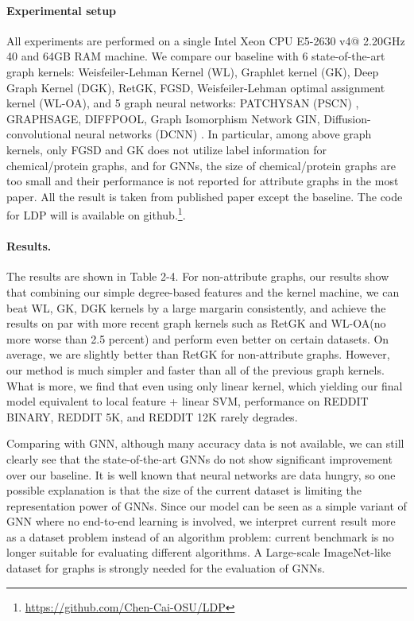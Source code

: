 \documentclass[11pt,onecolumn]{article}
\newcommand{\DOM}       {{LDP}\xspace}
\begin{document}
\paragraph{Experimental setup}
All experiments are performed on a single Intel Xeon CPU E5-2630 v4@ 2.20GHz  40 and 64GB RAM machine. We compare our baseline with 6 state-of-the-art graph kernels: Weisfeiler-Lehman Kernel (WL)\cite{shervashidze2011weisfeiler}, Graphlet kernel (GK)\cite{shervashidze2009efficient}, Deep Graph Kernel (DGK)\cite{yanardag2015deep}, RetGK\cite{zhang2018retgk}, FGSD\cite{verma2017hunt}, Weisfeiler-Lehman optimal assignment kernel (WL-OA)\cite{kriege2016valid}, and 5 graph neural networks: PATCHYSAN (PSCN) \cite{niepert2016learning}, GRAPHSAGE\cite{hamilton2017inductive}, DIFFPOOL\cite{ying2018hierarchical}, Graph Isomorphism Network GIN\cite{xu2018powerful}, Diffusion-convolutional neural networks (DCNN) \cite{atwood2016diffusion}.
In particular, among above graph kernels, only FGSD and GK does not utilize label information for chemical/protein graphs, and for GNNs, the size of chemical/protein graphs are too small and their performance is not reported for attribute graphs in the most paper.
 All the result is taken from published paper except the baseline. The code for \DOM{} will is available on github.\footnote{\url{https://github.com/Chen-Cai-OSU/LDP}}.

\paragraph{Results.} 
The results are shown in Table 2-4.
For non-attribute graphs, our results show that combining our simple degree-based features and the kernel machine, we can beat WL, GK, DGK kernels by a large margarin consistently, and achieve the results on par with more recent graph kernels such as RetGK and WL-OA(no more worse than 2.5 percent) and perform even better on certain datasets. On average, we are slightly better than RetGK for non-attribute graphs. However, our method is much simpler and faster than all of the previous graph kernels.  What is more, we find that even using only linear kernel, which yielding our final model equivalent to local feature + linear SVM,  performance on REDDIT BINARY, REDDIT 5K, and REDDIT 12K rarely degrades. 

Comparing with GNN, although many accuracy data is not available, we can still clearly see that the state-of-the-art GNNs do not show significant improvement over our baseline. It is well known that neural networks are data hungry, so one possible explanation is that the size of the current dataset is limiting the representation power of GNNs.  Since our model can be seen as a simple variant of GNN where no end-to-end learning is involved, we interpret current result more as a dataset problem instead of an algorithm problem: current benchmark is no longer suitable for evaluating different algorithms.  A Large-scale ImageNet-like dataset for graphs is strongly needed for the evaluation of GNNs.
\end{document}
